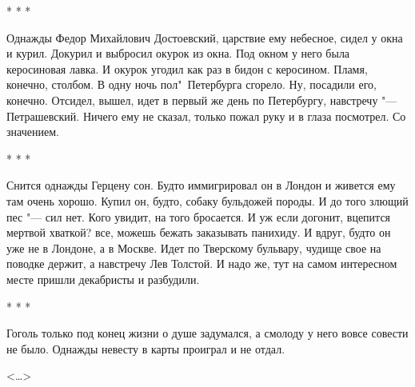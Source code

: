 \begin{center}
    * * *
\end{center}

    Однажды  Федор  Михайлович Достоевский, царствие ему небесное, 
сидел у окна и курил. Докурил и выбросил окурок  из  окна.
Под  окном  у  него была керосиновая лавка. И окурок угодил как
раз в бидон с керосином. Пламя, конечно, столбом. В  одну  ночь
пол"~Петербурга сгорело. Ну, посадили его, конечно. Отсидел, вышел,
идет  в  первый же день по Петербургу, навстречу "--- Петрашевский.
Ничего ему не сказал, только пожал руку и в глаза посмотрел. Со значением.

\begin{center}
    * * *
\end{center}

    Снится однажды Герцену сон. Будто иммигрировал он в  Лондон
и живется ему там очень хорошо. Купил он, будто, собаку бульдожей
породы. И до того злющий пес "--- сил нет. Кого увидит, на того  
бросается.  И  уж  если догонит, вцепится мертвой хваткой?
все, можешь бежать заказывать панихиду. И вдруг, будто  он  уже
не  в  Лондоне,  а в Москве. Идет по Тверскому бульвару, чудище
свое на поводке держит, а навстречу Лев Толстой. И надо же, тут
на самом интересном месте пришли декабристы и разбудили.

\begin{center}
    * * *
\end{center}

    Гоголь только под конец жизни о душе задумался, а смолоду у
него вовсе совести не было. Однажды невесту в карты проиграл  и
не отдал.

\begin{flushright}
    <\dots>
\end{flushright}